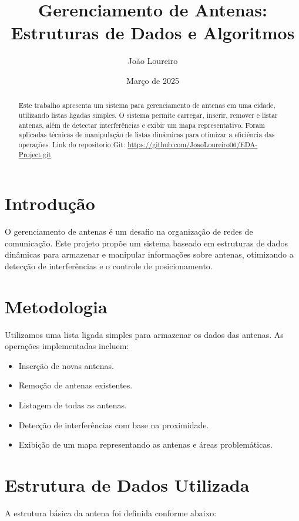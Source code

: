 \documentclass[12pt]{article}
\title{\textbf{Gerenciamento de Antenas: Estruturas de Dados e Algoritmos}}
\author{Jo\~ao Loureiro}
\date{Mar\c{c}o de 2025}
\begin{document}
\maketitle

\begin{abstract}
Este trabalho apresenta um sistema para gerenciamento de antenas em uma cidade, utilizando listas ligadas simples. O sistema permite carregar, inserir, remover e listar antenas, além de detectar interferências e exibir um mapa representativo. Foram aplicadas técnicas de manipulação de listas dinâmicas para otimizar a eficiência das operações.
Link do repositorio Git: \href{https://github.com/JoaoLoureiro06/EDA-Project.git}{https://github.com/JoaoLoureiro06/EDA-Project.git}
\end{abstract}

\tableofcontents
\newpage

\section{Introdução}
O gerenciamento de antenas é um desafio na organização de redes de comunicação. Este projeto propõe um sistema baseado em estruturas de dados dinâmicas para armazenar e manipular informações sobre antenas, otimizando a detecção de interferências e o controle de posicionamento.

\section{Metodologia}
Utilizamos uma lista ligada simples para armazenar os dados das antenas. As operações implementadas incluem:
\begin{itemize}
    \item Inserção de novas antenas.
    \item Remoção de antenas existentes.
    \item Listagem de todas as antenas.
    \item Detecção de interferências com base na proximidade.
    \item Exibição de um mapa representando as antenas e áreas problemáticas.
\end{itemize}

\section{Estrutura de Dados Utilizada}
A estrutura básica da antena foi definida conforme abaixo:
\end{document}
